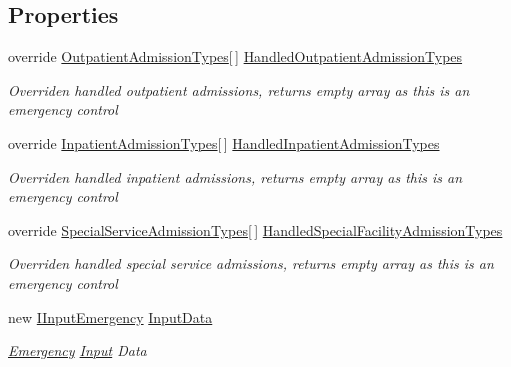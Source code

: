 \subsection*{Properties}
\begin{DoxyCompactItemize}
\item 
override \hyperlink{class_general_health_care_elements_1_1_treatment_admission_types_1_1_outpatient_admission_types}{Outpatient\+Admission\+Types}\mbox{[}$\,$\mbox{]} \hyperlink{class_general_health_care_elements_1_1_department_models_1_1_emergency_1_1_control_unit_emergency_ae486cdacd4641211b335c72d9fb76c97}{Handled\+Outpatient\+Admission\+Types}
\begin{DoxyCompactList}\small\item\em Overriden handled outpatient admissions, returns empty array as this is an emergency control \end{DoxyCompactList}\item 
override \hyperlink{class_general_health_care_elements_1_1_treatment_admission_types_1_1_inpatient_admission_types}{Inpatient\+Admission\+Types}\mbox{[}$\,$\mbox{]} \hyperlink{class_general_health_care_elements_1_1_department_models_1_1_emergency_1_1_control_unit_emergency_a19fadbc633ef570d752c1fbc83d1ff71}{Handled\+Inpatient\+Admission\+Types}
\begin{DoxyCompactList}\small\item\em Overriden handled inpatient admissions, returns empty array as this is an emergency control \end{DoxyCompactList}\item 
override \hyperlink{class_general_health_care_elements_1_1_treatment_admission_types_1_1_special_service_admission_types}{Special\+Service\+Admission\+Types}\mbox{[}$\,$\mbox{]} \hyperlink{class_general_health_care_elements_1_1_department_models_1_1_emergency_1_1_control_unit_emergency_aefedc4d8884639d5f533d908d7cb2e3b}{Handled\+Special\+Facility\+Admission\+Types}
\begin{DoxyCompactList}\small\item\em Overriden handled special service admissions, returns empty array as this is an emergency control \end{DoxyCompactList}\item 
new \hyperlink{interface_general_health_care_elements_1_1_department_models_1_1_emergency_1_1_i_input_emergency}{I\+Input\+Emergency} \hyperlink{class_general_health_care_elements_1_1_department_models_1_1_emergency_1_1_control_unit_emergency_ada4d7ab68e424c11f5df153161514d4b}{Input\+Data}
\begin{DoxyCompactList}\small\item\em \hyperlink{namespace_general_health_care_elements_1_1_department_models_1_1_emergency}{Emergency} \hyperlink{namespace_general_health_care_elements_1_1_input}{Input} Data \end{DoxyCompactList}\end{DoxyCompactItemize}
